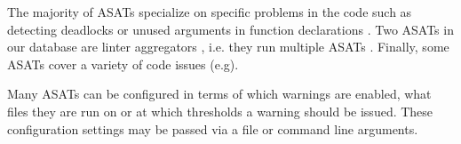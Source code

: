\documentclass{seal_article}
\begin{document}
The majority of ASATs specialize on specific problems in the code such as detecting deadlocks \cite{dingo-hunter} or unused arguments in function declarations \cite{nargs}. Two ASATs in our database are linter aggregators , i.e. they run multiple ASATs \cite{goreporter,golangci-lint}. Finally, some ASATs cover a variety of code issues (e.g\cite{staticcheck}). 

Many ASATs can be configured in terms of which warnings are enabled, what files they are run on or at which thresholds a warning should be issued. These configuration settings may be passed via a file or command line arguments.







\end{document}
